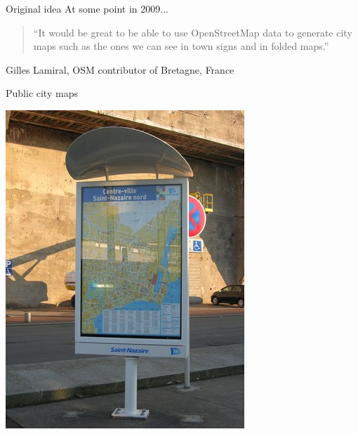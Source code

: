 \documentclass{beamer}
\begin{document}
\begin{frame}{Original idea}
  At some point in 2009...
  \vspace{1cm}
  \\
  \Large
  \begin{quote}
    ``It would be great to be able to use OpenStreetMap data to generate
    city maps such as the ones we can see in town signs and in folded
    maps.''
  \end{quote}
  \normalsize
  \vspace{1cm}
  \hfill Gilles Lamiral, OSM contributor of Bretagne, France
\end{frame}

\begin{frame}{Public city maps}
  \begin{center}
    \includegraphics[height=0.8\textheight]{public-city-map.jpg}
  \end{center}
\end{frame}
\end{document}
